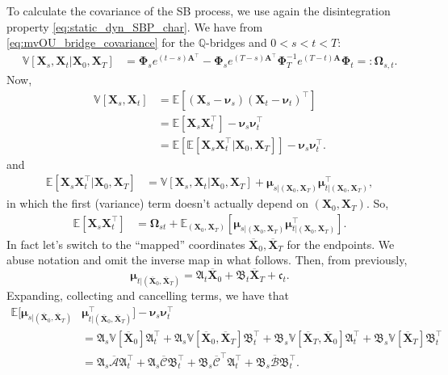 \documentclass{article}
\newcommand{\E}{\mathbb{E}}
\newcommand{\V}{\mathbb{V}}
\newcommand{\Ac}{\mathcal{A}}
\newcommand{\Bc}{\mathcal{B}}
\newcommand{\Cc}{\mathcal{C}}
\newcommand{\bmathfrak}[1]{\bm{\mathfrak{#1}}}
\theoremstyle{newstyle}
\begin{document}
To calculate the covariance of the SB process, we use again the disintegration property \eqref{eq:static_dyn_SBP_char}. We have from \eqref{eq:mvOU_bridge_covariance} for the $\mathbb{Q}$-bridges and $0 < s < t < T$:
\begin{align}
  \V[\bm{X}_s, \bm{X}_t | \bm{X}_0, \bm{X}_T] &= \bm{\Phi}_s e^{(t-s) \bm{A}^\top} - \bm{\Phi}_s e^{(T-s)\bm{A}^\top} \bm{\Phi}_T^{-1} e^{(T-t)\bm{A}} \bm{\Phi}_t =: \bm{\Omega}_{s, t}. 
\end{align}
Now,
\begin{align}
  \V[\bm{X}_s, \bm{X}_t] &= \E[(\bm{X}_s - \bm{\nu}_s) (\bm{X}_t - \bm{\nu}_t)^\top ] \\
               &= \E[\bm{X}_s \bm{X}_t^\top] - \bm{\nu}_s \bm{\nu}_t^\top \\
               &= \E[\E[\bm{X}_s \bm{X}_t^\top | \bm{X}_0, \bm{X}_T]] - \bm{\nu}_s \bm{\nu}_t^\top. 
\end{align}
and
\begin{align}
  \E[\bm{X}_s \bm{X}_t^\top | \bm{X}_0, \bm{X}_T] &= \V[\bm{X}_s, \bm{X}_t | \bm{X}_0, \bm{X}_T] + \bm{\mu}_{s | (\bm{X}_0, \bm{X}_T)} \bm{\mu}_{t | (\bm{X}_0, \bm{X}_T)}^\top , 
\end{align}
in which the first (variance) term doesn't actually depend on $(\bm{X}_0, \bm{X}_T)$. So,
\begin{align}
  \E[\bm{X}_s \bm{X}_t^\top] &= \bm{\Omega}_{st} + \E_{(\bm{X}_0, \bm{X}_T)} [\bm{\mu}_{s | (\bm{X}_0, \bm{X}_T)} \bm{\mu}_{t | (\bm{X}_0, \bm{X}_T)}^\top]. 
\end{align}
In fact let's switch to the ``mapped'' coordinates $\bm{\overline{X}}_0, \bm{\overline{X}}_T$ for the endpoints. We abuse notation and omit the inverse map in what follows. Then, from previously, 
\begin{equation}
  \bm{\mu}_{t | (\bm{\overline{X}}_0, \bm{\overline{X}}_T)} = \bmathfrak{A}_t \bm{\overline{X}}_0 + \bmathfrak{B}_t \bm{\overline{X}}_T + \bmathfrak{c}_t. 
\end{equation}
Expanding, collecting and cancelling terms, we have that
\begin{align}
  \E[\bm{\mu}_{s | (\bm{\overline{X}}_0, \bm{\overline{X}}_T)} & \bm{\mu}_{t | (\bm{\overline{X}}_0, \bm{\overline{X}}_T)}^\top] - \bm{\nu}_s \bm{\nu}_t^\top \\
  &= \bmathfrak{A}_s \V[\bm{\overline{X}}_0] \bmathfrak{A}_t^\top + \bmathfrak{A}_s \V[\bm{\overline{X}}_0, \bm{\overline{X}}_T] \bmathfrak{B}_t^\top + \bmathfrak{B}_s \V[\bm{\overline{X}}_T, \bm{\overline{X}}_0] \bmathfrak{A}_t^\top + \bmathfrak{B}_s \V[\bm{\overline{X}}_T] \bmathfrak{B}_t^\top  \\
  &= \bmathfrak{A}_s \bm{\overline{\Ac}} \bmathfrak{A}_t^\top + \bmathfrak{A}_s \bm{\overline{\Cc}} \bmathfrak{B}_t^\top + \bmathfrak{B}_s \bm{\overline{\Cc}}^\top \bmathfrak{A}_t^\top + \bmathfrak{B}_s \bm{\overline{\Bc}} \bmathfrak{B}_t^\top. 
\end{align}
\end{document}
